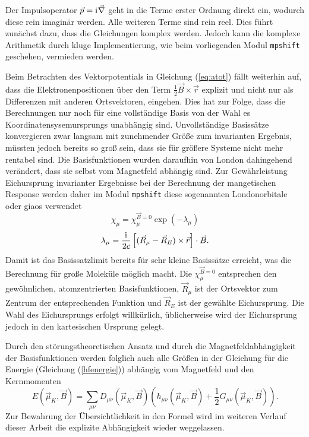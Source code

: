 	Der Impulsoperator $\vec{p}=\mathrm{i}\mkern1mu\vec{\nabla}$ geht in die Terme erster Ordnung direkt ein, wodurch diese rein imaginär werden. Alle weiteren Terme sind rein reel. Dies führt zunächst dazu, dass die Gleichungen komplex werden. Jedoch kann die komplexe Arithmetik durch kluge Implementierung, wie beim vorliegenden Modul \texttt{mpshift} geschehen, vermieden werden. 
	
	Beim Betrachten des Vektorpotentials in Gleichung (\ref{eq:atot}) fällt weiterhin auf, dass die Elektronenpositionen über den Term $\frac{1}{2}\vec{B}\times
	\vec{r}$ explizit und nicht nur als Differenzen mit anderen Ortsvektoren, eingehen. Dies hat zur Folge, dass die Berechnungen nur noch für eine vollständige Basis von der Wahl es Koordinatensysemursprungs unabhängig sind. Unvollständige Basissätze konvergieren zwar langsam mit zunehmender Größe zum invarianten Ergebnis, müssten jedoch bereits so groß sein, dass sie für größere Systeme nicht mehr rentabel sind. Die Basisfunktionen wurden daraufhin von London\supercite{london1937theorie} dahingehend verändert, dass sie selbst vom Magnetfeld abhängig sind. Zur Gewährleistung Eichursprung invarianter Ergebnisse bei der Berechnung der mangetischen Response werden daher im Modul \texttt{mpshift} diese sogenannten Londonorbitale oder \acp{giao}\supercite{ditchfield1974self,london1937theorie} verwendet
	\begin{equation}\label{eq:giao}
	  \chi_\mu=\chi_\mu^{\vec{B}=0}\exp(-\lambda_\mu)
	\end{equation}
	\begin{equation}
	  \lambda_\mu=\frac{\mathrm{i}\mkern1mu}{2c}\left[(\vec{R}_\mu-\vec{R}_E)\times \vec{r}\right]\cdot \vec{B}.
  	\end{equation}
  	Damit ist das Basissatzlimit bereits für sehr kleine Basissätze erreicht\supercite{van2012use}, was die Berechnung für große Moleküle möglich macht. Die $\chi_\mu^{\vec{B}=0}$ entsprechen den gewöhnlichen, atomzentrierten Basisfunktionen, $\vec{R}_\mu$ ist der Ortsvektor zum Zentrum der entsprechenden Funktion und $\vec{R}_E$ ist der gewählte Eichursprung. Die Wahl des Eichursprungs erfolgt willkürlich, üblicherweise wird der Eichursprung jedoch in den kartesischen Ursprung gelegt. 
  	
  	\bigskip
  	Durch den störungstheoretischen Ansatz und durch die Magnetfeldabhängigkeit der Basisfunktionen werden folglich auch alle Größen in der Gleichung für die Energie (Gleichung (\ref{hfenergie})) abhängig vom Magnetfeld und den Kernmomenten
  	\begin{equation}\label{eq:evonmub}
  	  E(\vec{\mu}_K,\vec{B})=\sum_{\mu\nu}D_{\mu\nu}(\vec{\mu}_K,\vec{B})(h_{\mu\nu}(\vec{\mu}_K,\vec{B})+\frac{1}{2}G_{\mu\nu}(\vec{\mu}_K,\vec{B})).
	\end{equation}  	 
  	Zur Bewahrung der Übersichtlichkeit in den Formel wird im weiteren Verlauf dieser Arbeit die explizite Abhängigkeit wieder weggelassen. 
  	
